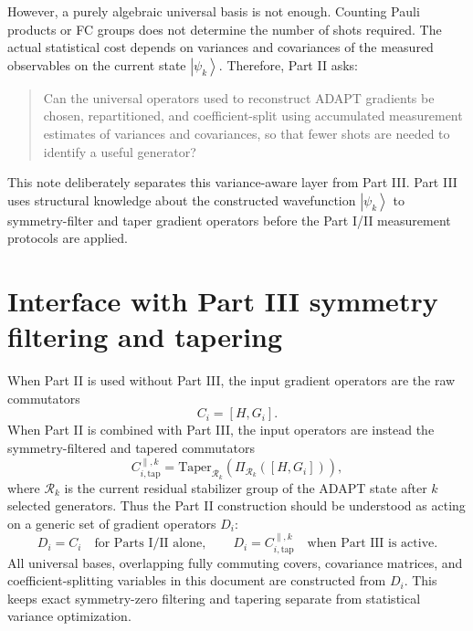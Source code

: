 \documentclass[11pt]{article}
\newcommand{\ket}[1]{\left|#1\right\rangle}
\begin{document}
However, a purely algebraic universal basis is not enough. Counting Pauli products or FC groups does not determine the number of shots required. The actual statistical cost depends on variances and covariances of the measured observables on the current state $\ket{\psi_k}$. Therefore, Part II asks:

\begin{quote}
Can the universal operators used to reconstruct ADAPT gradients be chosen, repartitioned, and coefficient-split using accumulated measurement estimates of variances and covariances, so that fewer shots are needed to identify a useful generator?
\end{quote}

This note deliberately separates this variance-aware layer from Part III. Part III uses structural knowledge about the constructed wavefunction $\ket{\psi_k}$ to symmetry-filter and taper gradient operators before the Part I/II measurement protocols are applied.


\section{Interface with Part III symmetry filtering and tapering}

When Part II is used without Part III, the input gradient operators are the raw commutators
\begin{equation}
    C_i=[H,G_i].
\end{equation}
When Part II is combined with Part III, the input operators are instead the symmetry-filtered and tapered commutators
\begin{equation}
    C_{i,\mathrm{tap}}^{\parallel,k}
    =\mathrm{Taper}_{\mathcal R_k}\left(\Pi_{\mathcal R_k}([H,G_i])\right),
    \label{eq:part3-input}
\end{equation}
where $\mathcal R_k$ is the current residual stabilizer group of the ADAPT state after $k$ selected generators. Thus the Part II construction should be understood as acting on a generic set of gradient operators $D_i$:
\begin{equation}
    D_i = C_i \quad \text{for Parts I/II alone},
    \qquad
    D_i = C_{i,\mathrm{tap}}^{\parallel,k} \quad \text{when Part III is active}.
\end{equation}
All universal bases, overlapping fully commuting covers, covariance matrices, and coefficient-splitting variables in this document are constructed from $D_i$. This keeps exact symmetry-zero filtering and tapering separate from statistical variance optimization.
\end{document}
